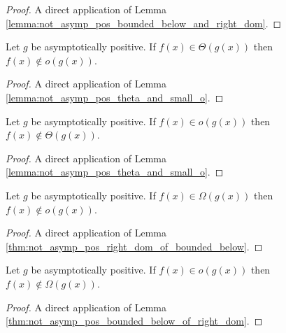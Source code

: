 \begin{proof}
    \leanok
    A direct application of Lemma \ref{lemma:not_asymp_pos_bounded_below_and_right_dom}.
\end{proof}

\begin{lemma}
    \label{lemma:not_asymp_pos_small_o_of_theta}
    \leanok
    Let $g$ be asymptotically positive. If $f(x) \in \Theta(g(x))$ then $f(x) \notin o(g(x))$.
\end{lemma}

\begin{proof}
    \leanok
    A direct application of Lemma \ref{lemma:not_asymp_pos_theta_and_small_o}.
\end{proof}

\begin{lemma}
    \label{lemma:not_asymp_pos_theta_of_small_o}
    \leanok
    Let $g$ be asymptotically positive. If $f(x) \in o(g(x))$ then $f(x) \notin \Theta(g(x))$.
\end{lemma}

\begin{proof}
    \leanok
    A direct application of Lemma \ref{lemma:not_asymp_pos_theta_and_small_o}.
\end{proof}

\begin{lemma}
    \label{lemma:not_asymp_pos_o_of_big_omega}
    \leanok
    Let $g$ be asymptotically positive. If $f(x) \in \Omega(g(x))$ then $f(x) \notin o(g(x))$.
\end{lemma}

\begin{proof}
    \leanok
    A direct application of Lemma \ref{thm:not_asymp_pos_right_dom_of_bounded_below}.
\end{proof}

\begin{lemma}
    \label{lemma:not_asymp_pos_big_omega_of_o}
    \leanok
    Let $g$ be asymptotically positive. If $f(x) \in o(g(x))$ then $f(x) \notin \Omega(g(x))$.
\end{lemma}

\begin{proof}
    \leanok
    A direct application of Lemma \ref{thm:not_asymp_pos_bounded_below_of_right_dom}.
\end{proof}

